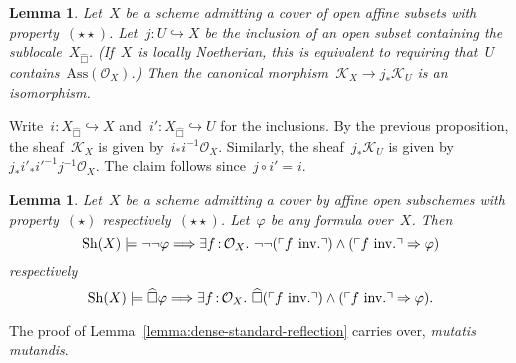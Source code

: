 \documentclass[10pt,reqno,a4paper]{amsbook}
\makeatletter
\theoremstyle{definition}
\theoremstyle{plain}
\newtheorem{lemma}[defn]{Lemma}
\theoremstyle{remark}
\renewcommand{\O}{\mathcal{O}}
\newcommand{\K}{\mathcal{K}}
\newcommand{\Sh}{\mathrm{Sh}}
\newcommand{\Ass}{\mathrm{Ass}}
\newcommand{\?}{\,{:}\,}
\renewcommand{\_}{\mathpunct{.}\,}
\newcommand{\speak}[1]{\ulcorner\text{\textnormal{#1}}\urcorner}
\newcommand{\sdense}{{\widehat\Box}}
\newcommand{\inv}{inv.\@}
\newcommand{\XXXh}[1]{}
\renewenvironment{proof}[1][\proofname]{\par
  \pushQED{\qed}%
  \normalfont \topsep6\p@\@plus6\p@\relax
  \trivlist
  \item[\hskip\labelsep
        \itshape
    #1\@addpunct{.}]\ignorespaces
}{%
  \popQED\endtrivlist\@endpefalse
}
\makeatother
\begin{document}
\begin{lemma}
Let~$X$ be a scheme admitting a cover of open affine subsets with
property~$(\star\star)$. Let~$j : U \hookrightarrow X$ be the inclusion of an
open subset containing the sublocale~$X_\sdense$. (If~$X$ is locally
Noetherian, this is equivalent to requiring that~$U$ contains~$\Ass(\O_X)$.)
Then the canonical morphism~$\K_X \to j_* \K_U$ is an isomorphism.
\end{lemma}
\begin{proof}Write~$i : X_\sdense \hookrightarrow X$ and~$i' : X_\sdense
\hookrightarrow U$ for the inclusions. By the previous proposition, the
sheaf~$\K_X$ is given by~$i_* i^{-1} \O_X$. Similarly, the sheaf~$j_* \K_U$ is
given by~$j_* i'_* i'^{-1} j^{-1} \O_X$. The claim follows since~$j \circ i' =
i$.
\end{proof}
\XXXh{Does U admit a (**)-cover if X does?}

\begin{lemma}\label{lemma:dense-standard-reflection-generalized}
Let~$X$ be a scheme admitting a cover by affine open subschemes
with property~$(\star)$ respectively~$(\star\star)$. Let~$\varphi$ be any formula
over~$X$. Then
\[ \Sh(X) \models \neg\neg\varphi \Longrightarrow \exists f\?\O_X\_
  \neg\neg(\speak{$f$ \inv}) \wedge (\speak{$f$ \inv} \Rightarrow \varphi) \]
respectively
\[ \Sh(X) \models \sdense\varphi \Longrightarrow \exists f\?\O_X\_
  \sdense(\speak{$f$ \inv}) \wedge (\speak{$f$ \inv} \Rightarrow \varphi). \]
\end{lemma}
\begin{proof}The proof of Lemma~\ref{lemma:dense-standard-reflection} carries
over, \emph{mutatis mutandis}.
\end{proof}
\end{document}
